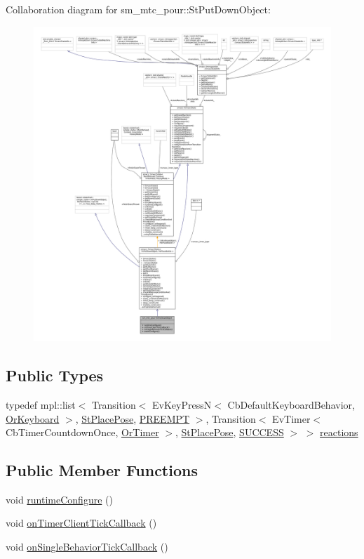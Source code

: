 Collaboration diagram for sm\+\_\+mtc\+\_\+pour\+:\+:St\+Put\+Down\+Object\+:
\nopagebreak
\begin{figure}[H]
\begin{center}
\leavevmode
\includegraphics[width=350pt]{structsm__mtc__pour_1_1StPutDownObject__coll__graph}
\end{center}
\end{figure}
\subsection*{Public Types}
\begin{DoxyCompactItemize}
\item 
typedef mpl\+::list$<$ Transition$<$ Ev\+Key\+PressN$<$ Cb\+Default\+Keyboard\+Behavior, \hyperlink{classsm__mtc__pour_1_1OrKeyboard}{Or\+Keyboard} $>$, \hyperlink{structsm__mtc__pour_1_1StPlacePose}{St\+Place\+Pose}, \hyperlink{classPREEMPT}{P\+R\+E\+E\+M\+PT} $>$, Transition$<$ Ev\+Timer$<$ Cb\+Timer\+Countdown\+Once, \hyperlink{classsm__mtc__pour_1_1OrTimer}{Or\+Timer} $>$, \hyperlink{structsm__mtc__pour_1_1StPlacePose}{St\+Place\+Pose}, \hyperlink{classSUCCESS}{S\+U\+C\+C\+E\+SS} $>$ $>$ \hyperlink{structsm__mtc__pour_1_1StPutDownObject_aa6260e2e52eef27a38a549540092cc04}{reactions}
\end{DoxyCompactItemize}
\subsection*{Public Member Functions}
\begin{DoxyCompactItemize}
\item 
void \hyperlink{structsm__mtc__pour_1_1StPutDownObject_ae148b8bac6fe3cdfc1fced299ace521f}{runtime\+Configure} ()
\item 
void \hyperlink{structsm__mtc__pour_1_1StPutDownObject_aa6ea3af5ea4fe31cf798812d991e3616}{on\+Timer\+Client\+Tick\+Callback} ()
\item 
void \hyperlink{structsm__mtc__pour_1_1StPutDownObject_ad04f8a9b6eeb0872c0edb1595f11be97}{on\+Single\+Behavior\+Tick\+Callback} ()
\end{DoxyCompactItemize}
